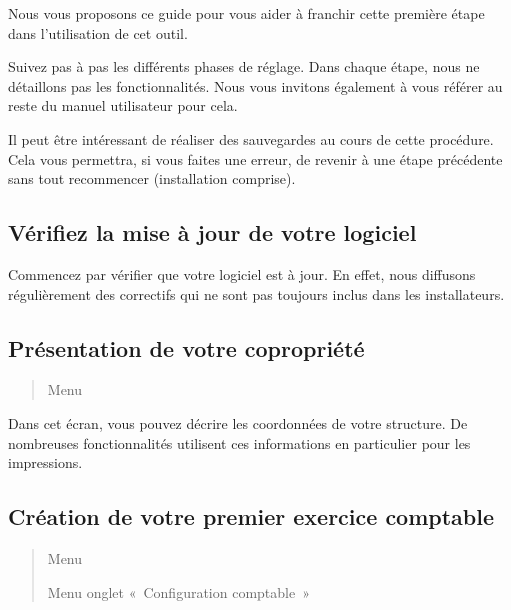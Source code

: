 \documentclass[a4paper,10pt,oneside,french]{sphinxmanual}
\begin{document}
\sphinxAtStartPar
Nous vous proposons ce guide pour vous aider à franchir cette première étape dans l’utilisation de cet outil.

\sphinxAtStartPar
Suivez pas à pas les différents phases de réglage. Dans chaque étape, nous ne détaillons pas les fonctionnalités. Nous vous invitons également à vous référer au reste du manuel utilisateur pour cela.

\sphinxAtStartPar
Il peut être intéressant de réaliser des sauvegardes au cours de cette procédure.
Cela vous permettra, si vous faites une erreur, de revenir à une étape précédente sans tout recommencer (installation comprise).


\subsection{Vérifiez la mise à jour de votre logiciel}
\label{\detokenize{syndic/first_step:verifiez-la-mise-a-jour-de-votre-logiciel}}
\sphinxAtStartPar
Commencez par vérifier que votre logiciel est à jour.
En effet, nous diffusons régulièrement des correctifs qui ne sont pas toujours inclus dans les installateurs.


\subsection{Présentation de votre copropriété}
\label{\detokenize{syndic/first_step:presentation-de-votre-copropriete}}\begin{quote}

\sphinxAtStartPar
Menu 
\end{quote}

\sphinxAtStartPar
Dans cet écran, vous pouvez décrire les coordonnées de votre structure.
De nombreuses fonctionnalités utilisent ces informations en particulier pour les impressions.


\subsection{Création de votre premier exercice comptable}
\label{\detokenize{syndic/first_step:creation-de-votre-premier-exercice-comptable}}\begin{quote}

\sphinxAtStartPar
Menu 

\sphinxAtStartPar
Menu  \sphinxhyphen{} onglet « Configuration comptable »
\end{quote}
\end{document}

